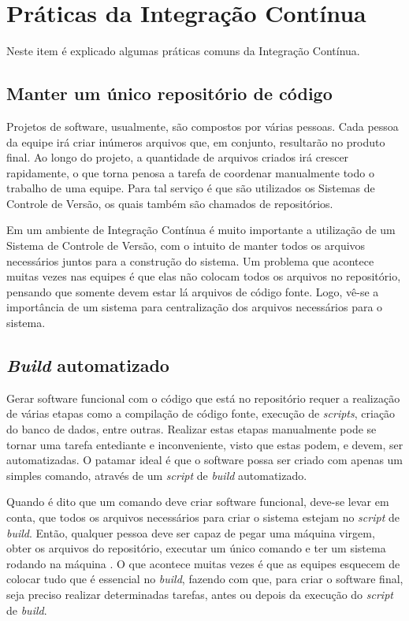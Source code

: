 \section{Práticas da Integração Contínua}

Neste item é explicado algumas práticas comuns da Integração Contínua.

\subsection{Manter um único repositório de código}

Projetos de software, usualmente, são compostos por várias pessoas. Cada pessoa da equipe irá criar inúmeros arquivos que, em conjunto, resultarão no produto final. Ao longo do projeto, a quantidade de arquivos criados irá crescer rapidamente, o que torna penosa a tarefa de coordenar manualmente todo o trabalho de uma equipe. Para tal serviço é que são utilizados os Sistemas de Controle de Versão, os quais também são chamados de repositórios.

Em um ambiente de Integração Contínua é muito importante a utilização de um Sistema de Controle de Versão, com o intuito de manter todos os arquivos necessários juntos para a construção do sistema. Um problema que acontece muitas vezes nas equipes é que elas não colocam todos os arquivos no repositório, pensando que somente devem estar lá arquivos de código fonte. Logo, vê-se a importância de um sistema para centralização dos arquivos necessários para o sistema.

\subsection{\textit{Build} automatizado}

Gerar software funcional com o código que está no repositório requer a realização de várias etapas como a compilação de código fonte, execução de \textit{scripts}, criação do banco de dados, entre outras. Realizar estas etapas manualmente pode se tornar uma tarefa entediante e inconveniente, visto que estas podem, e devem, ser automatizadas. O patamar ideal é que o software possa ser criado com apenas um simples comando, através de um \textit{script} de \textit{build} automatizado.

Quando é dito que um comando deve criar software funcional, deve-se levar em conta, que todos os arquivos necessários para criar o sistema estejam no \textit{script} de \textit{build}. Então, qualquer pessoa deve ser capaz de pegar uma máquina virgem, obter os arquivos do repositório, executar um único comando e ter um sistema rodando na máquina \cite{FOWLER}. O que acontece muitas vezes é que as equipes esquecem de colocar tudo que é essencial no \textit{build}, fazendo com que, para criar o software final, seja preciso realizar determinadas tarefas, antes ou depois da execução do \textit{script} de \textit{build}.

